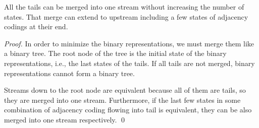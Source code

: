 \begin{property}\label{pro:tail}
	All the tails can be merged into one stream without increasing the number of states. 
	That merge can extend to upstream including a few states of adjacency codings at their end. 
\end{property}
\begin{proof}
	In order to minimize the binary representations, we must merge them like a binary tree.
	The root node of the tree is the initial state of the binary representations, i.e., the last states of the tails.
	If all tails are not merged, binary representations cannot form a binary tree.

	Streams down to the root node are equivalent because all of them are tails, so they are merged into one stream.
	Furthermore, if the last few states in some combination of adjacency coding flowing into tail is equivalent, they can be also merged into one stream respectively. \qed
\end{proof}

